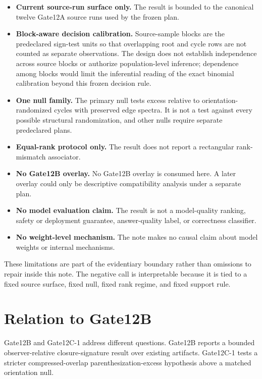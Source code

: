 \documentclass[11pt]{article}
\begin{document}
\begin{itemize}
    \item \textbf{Current source-run surface only.} The result is bounded to the
    canonical twelve Gate12A source runs used by the frozen plan.
    \item \textbf{Block-aware decision calibration.} Source-sample blocks are
    the predeclared sign-test units so that overlapping root and cycle rows are
    not counted as separate observations. The design does not establish
    independence across source blocks or authorize population-level inference;
    dependence among blocks would limit the inferential reading of the exact
    binomial calibration beyond this frozen decision rule.
    \item \textbf{One null family.} The primary null tests excess relative to
    orientation-randomized cycles with preserved edge spectra. It is not a test
    against every possible structural randomization, and other nulls require
    separate predeclared plans.
    \item \textbf{Equal-rank protocol only.} The result does not report a
    rectangular rank-mismatch associator.
    \item \textbf{No Gate12B overlay.} No Gate12B overlay is consumed here. A
    later overlay could only be descriptive compatibility analysis under a
    separate plan.
    \item \textbf{No model evaluation claim.} The result is not a model-quality
    ranking, safety or deployment guarantee, answer-quality label, or
    correctness classifier.
    \item \textbf{No weight-level mechanism.} The note makes no causal claim
    about model weights or internal mechanisms.
\end{itemize}

These limitations are part of the evidentiary boundary rather than omissions to
repair inside this note. The negative call is interpretable because it is tied
to a fixed source surface, fixed null, fixed rank regime, and fixed support
rule.

\section{Relation to Gate12B}
\label{sec:relation-gate12b}

Gate12B and Gate12C-1 address different questions. Gate12B reports a bounded
observer-relative closure-signature result over existing artifacts. Gate12C-1
tests a stricter compressed-overlap parenthesization-excess hypothesis above a
matched orientation null.
\end{document}
